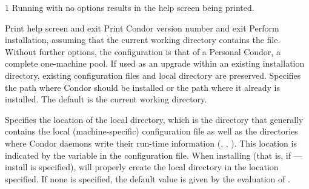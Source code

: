 \begin{ManPage}{\label{man-condor-configure}}{1}
Running  with no options results in the
help screen being printed.

\begin{Options}
	 {Print help screen and exit}
	 {Print Condor version number and exit}
	 {Perform installation, assuming that
	the current working directory contains the 
	file.  Without further options, the configuration is that of
	a Personal Condor, a complete one-machine pool.
	If used as an 
	upgrade within an existing installation directory, existing 
	configuration files and local directory are preserved.}
	 {Specifies the path
	where Condor should be installed or the path where it already is
	installed. The default is the current working directory.}
	 {Specifies the
	location of the local directory, which is the directory that generally 
	contains the local (machine-specific) configuration file as well as the
	directories where Condor daemons write their run-time information 
	(, , ).
	This location is indicated  by the  
	variable in the configuration file. 
	When installing (that is, if ---install is specified),
	will properly create the local directory in the location specified.
	If none is specified, the default value is given by the evaluation of
        .

}
\end{Options}
\end{ManPage}
